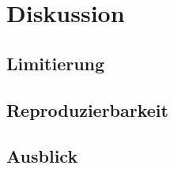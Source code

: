 \section{Diskussion}

\subsection{Limitierung}
\subsection{Reproduzierbarkeit}
\subsection{Ausblick}
